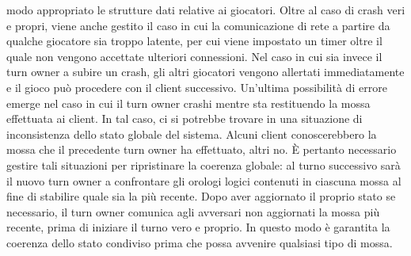 modo appropriato le strutture dati relative ai giocatori. Oltre al caso di crash 
veri e propri, viene anche gestito il caso in cui la comunicazione di rete a 
partire da qualche giocatore sia troppo latente, per cui viene impostato un 
timer oltre il quale non vengono accettate ulteriori connessioni.
Nel caso in cui sia invece il turn owner a subire un crash, gli altri giocatori 
vengono allertati immediatamente e il gioco può procedere con il client 
successivo.
Un'ultima possibilità di errore emerge nel caso in cui il turn owner crashi 
mentre sta restituendo la mossa effettuata ai client. In tal caso, ci 
si potrebbe trovare in una situazione di inconsistenza dello stato globale del 
sistema. Alcuni client conoscerebbero la mossa che il precedente turn owner ha 
effettuato, altri no. È pertanto necessario gestire tali situazioni per 
ripristinare la coerenza globale: al turno successivo sarà il nuovo turn owner 
a confrontare gli orologi logici contenuti in ciascuna mossa al fine di 
stabilire quale sia la più recente. Dopo aver aggiornato il proprio stato se 
necessario, il turn owner comunica agli avversari non aggiornati la mossa più 
recente, prima di iniziare il turno vero e proprio. In questo modo è garantita 
la coerenza dello stato condiviso prima che possa avvenire qualsiasi tipo di 
mossa.